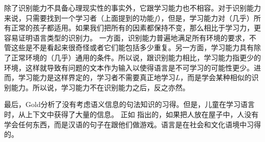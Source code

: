 除了识别能力不具备心理现实性的事实外，它跟学习能力也不相容\citep[]{Johnson2004a}。对于识别能力来说，只需要找到一个学习者（上面提到的功能$f$），但是，学习能力对（几乎）所有正常的孩子都适用。如果我们把所有的因素都保持不变，那么相比于学习力，更容易证明语言类型的识别力。
一方面，识别能力普遍地满足所有环境的要求，不管这些是不是看起来很奇怪或者它们能包括多少重复。另一方面，学习能力具有除了正常环境的（几乎）通用的条件。所以说，跟识别能力相比，学习能力指更少的环境，这样就导致有问题的文本作为输入以使得语言是不可学习的可能性更少。进而，学习能力是这样界定的，学习者不需要真正地学习$L$，而是学会某种相似的识别能力。所以说，学习能力不在识别能力之后，反之亦然。

最后，Gold分析了没有考虑语义信息的句法知识的习得。但是，儿童在学习语言时，从上下文中获得了大量的信息\citep{TCCBM2005a}。 正如 \citet[]{Klein86a-u}指出的，如果把人放在屋子中，人没有学会任何东西，而是汉语的句子在跟他们做游戏。语言是在社会和文化语境中习得的。
 
